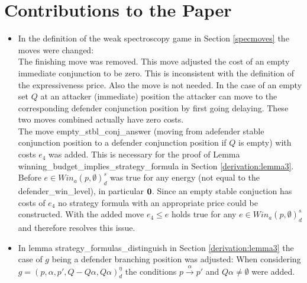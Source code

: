 \section{Contributions to the Paper}

\begin{itemize}
\item In the definition of the weak spectroscopy game in Section \ref{specmoves} the moves were changed: 
\\
The finishing move was removed. This move adjusted the cost of an empty immediate conjunction to be zero.
This is inconsistent with the definition of the expressiveness price. Also the move is not needed. In the 
case of an empty set $Q$ at an attacker (immediate) position the attacker can move to the corresponding 
defender conjunction position by first going delaying. These two moves combined actually have zero costs.
\\
The move empty\_stbl\_conj\_answer (moving from adefender stable conjunction position to a defender conjunction
position if $Q$ is empty) with costs $e_4$ was added. This is necessary for the proof of Lemma 
winning\_budget\_implies\_strategy\_formula in Section \ref{derivation:lemma3}. Before 
$e \in Win_a (p, \emptyset)_d^s $ was true for any energy (not equal to the defender\_win\_level), in particular $\bold{0}$. 
Since an empty stable conjuction has costs of $e_4$ no strategy formula with an appropriate price could be constructed. 
With the added move $e_4 \leq e $ holds true for any $e \in Win_a (p, \emptyset)_d^s $ and therefore resolves this issue.
\item In lemma strategy\_formulas\_distinguish in Section \ref{derivation:lemma3} the case of $g$ being a defender branching position was adjusted: 
When considering $g=(p,\alpha ,p', Q- Q \alpha, Q \alpha)_d^\eta$ the conditions $p \overset{\alpha}{\longrightarrow} p'$ and $Q \alpha \neq \emptyset$ were 
added. 
\end{itemize}